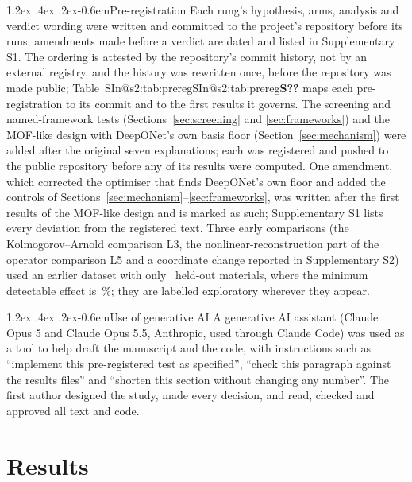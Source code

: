 \documentclass[10pt,a4paper]{article}
\makeatletter
\renewcommand\paragraph{\@startsection{paragraph}{4}{\z@}%
  {1.2ex \@plus .4ex \@minus .2ex}{-0.6em}{\normalfont\normalsize\bfseries}}
\newcommand{\SIref}[1]{\ifcsname SIn@#1\endcsname\csname SIn@#1\endcsname\else\textbf{S??}\fi}
\makeatother
\begin{document}
\paragraph{Pre-registration} Each rung's hypothesis, arms, analysis and verdict wording were
written and committed to the project's repository before its runs; amendments made
before a verdict are dated and listed in Supplementary S1. The ordering is attested by
the repository's commit history, not by an external registry, and the history was
rewritten once, before the repository was made public; Table~\SIref{s2:tab:prereg} maps each
pre-registration to its commit and to the first results it governs. The
screening and named-framework tests (Sections~\ref{sec:screening} and
\ref{sec:frameworks}) and the MOF-like design with DeepONet's own basis floor
(Section~\ref{sec:mechanism}) were added after the original seven explanations; each was
registered and pushed to the public repository before any of its results were computed. One
amendment, which corrected the optimiser that finds DeepONet's own floor and added the controls of
Sections~\ref{sec:mechanism}--\ref{sec:frameworks}, was written after the first results of the
MOF-like design and is marked as such; Supplementary S1 lists every deviation from the
registered text.
Three early comparisons (the Kolmogorov--Arnold comparison L3, the nonlinear-reconstruction
part of the operator comparison L5 and a coordinate change reported in Supplementary S2) used an earlier dataset with only
\nNclustLegacy\ held-out materials, where the minimum detectable effect is \nLegacyMDE\,\%;
they are labelled exploratory wherever they appear.

\paragraph{Use of generative AI} A generative AI assistant (Claude Opus 5 and Claude Opus
5.5, Anthropic, used through Claude Code) was used as a tool to help draft the manuscript
and the code, with instructions such as ``implement this pre-registered test as
specified'', ``check this paragraph against the results files'' and ``shorten this section
without changing any number''. The first author designed the study, made every decision,
and read, checked and approved all text and code.

\section{Results}
\label{sec:results}
\end{document}
